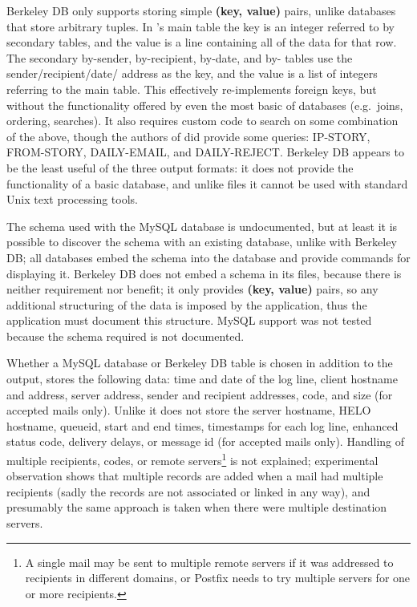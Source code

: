 Berkeley DB only supports storing simple \textbf{(key, value)} pairs,
unlike  databases that store arbitrary tuples.  In
's main table the key is an integer referred to by secondary
tables, and the value is a  line containing all of the data
for that row.  The secondary by-sender, by-recipient, by-date, and
by- tables use the sender/recipient/date/ address
as the key, and the value is a  list of integers referring to
the main table.  This effectively re-implements  foreign keys,
but without the functionality offered by even the most basic of
 databases (e.g.\ joins, ordering, searches).  It also
requires custom code to search on some combination of the above, though the
authors of  did provide some queries: IP-STORY, FROM-STORY,
DAILY-EMAIL, and DAILY-REJECT\@.  Berkeley DB appears to be the least
useful of the three output formats: it does not provide the functionality
of a basic  database, and unlike  files it cannot
be used with standard Unix text processing tools.

The schema used with the MySQL database is undocumented, but at least it is
possible to discover the schema with an existing  database,
unlike with Berkeley DB\@; all  databases embed the schema
into the database and provide commands for displaying it.  Berkeley DB does
not embed a schema in its files, because there is neither requirement nor
benefit; it only provides \textbf{(key, value)} pairs, so any additional
structuring of the data is imposed by the application, thus the application
must document this structure.  MySQL support was not tested because the
schema required is not documented.

Whether a MySQL database or Berkeley DB table is chosen in addition to the
 output,  stores the following data: time and
date of the log line, client hostname and  address, server
 address, sender and recipient addresses,  code,
and size (for accepted mails only).  Unlike \parsername{} it does not store
the server hostname, HELO hostname, queueid, start and end times,
timestamps for each log line, enhanced status code, delivery delays, or
message id (for accepted mails only).  Handling of multiple recipients,
 codes, or remote servers\footnote{A single mail may be sent
to multiple remote servers if it was addressed to recipients in different
domains, or Postfix needs to try multiple servers for one or more
recipients.} is not explained; experimental observation shows that multiple
records are added when a mail had multiple recipients (sadly the records
are not associated or linked in any way), and presumably the same approach
is taken when there were multiple destination servers.

